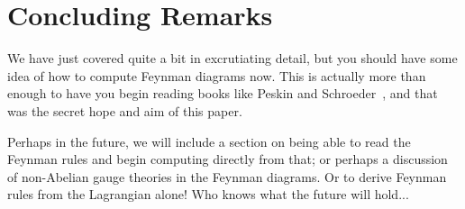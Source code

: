 \section*{Concluding Remarks}

We have just covered quite a bit in excrutiating detail, but you should have 
some idea of how to compute Feynman diagrams now. This is actually more than
enough to have you begin reading books like Peskin and Schroeder~\cite{peskinSchroeder}, and that was
the secret hope and aim of this paper. 

Perhaps in the future, we will include a section on being able to read the
Feynman rules and begin computing directly from that; or perhaps a discussion of
non-Abelian gauge theories in the Feynman diagrams. Or to derive Feynman rules
from the Lagrangian alone! Who knows what the future will hold...
